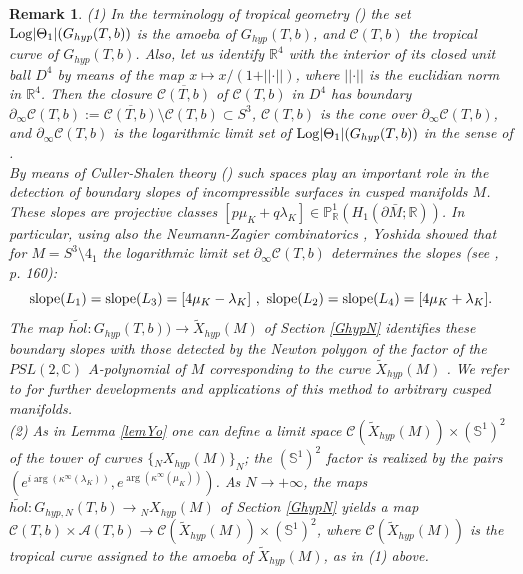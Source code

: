 \documentclass[11pt]{amsart}
\newtheorem{remark}[teo]{Remark}
\newcommand{\mr}{\mathbb{R}}
\newcommand{\mc}{\mathbb{C}}
\newcommand{\ra}{\rightarrow}
\begin{document}
{\begin{remark}\label{tropremk} {\rm (1) In the terminology of tropical geometry (\cite{V}) the set ${\rm Log}\vert \Theta_1\vert(G_{hyp}(T,b))$ is the {\it amoeba} of $G_{hyp}(T,b)$, and $\mathcal{C}(T,b)$ the {\it tropical curve} of $G_{hyp}(T,b)$. Also, let us identify $\mr^4$ with the interior of its closed unit ball $D^{4}$ by means of the map $x\mapsto x/(1+ \vert \vert \cdot \vert \vert)$, where $\vert \vert \cdot \vert \vert$ is the euclidian norm in $\mr^4$. Then the closure $\overline{\mathcal{C}(T,b)}$ of $\mathcal{C}(T,b)$ in $D^{4}$ has boundary $\partial_\infty \mathcal{C}(T,b) := \overline{\mathcal{C}(T,b)}\setminus \mathcal{C}(T,b)\subset S^3$,  $\mathcal{C}(T,b)$ is the cone over $\partial_\infty \mathcal{C}(T,b)$, and $\partial_\infty \mathcal{C}(T,b)$ is the {\it logarithmic limit set} of ${\rm Log}\vert \Theta_1\vert(G_{hyp}(T,b))$ in the sense of \cite{Berg}.\\
By means of Culler-Shalen theory (\cite{CS,Shalen}) such spaces play an important role in the detection of boundary slopes of incompressible surfaces in cusped manifolds $M$. These slopes are projective classes $[p\mu_K + q\lambda_K]\in \mathbb{P}^1_\mr(H_1(\partial \bar M;\mr))$. In particular, using also the Neumann-Zagier combinatorics \cite{NZ}, Yoshida showed that for $M=S^3\setminus 4_1$ the logarithmic limit set $\partial_\infty \mathcal{C}(T,b)$ determines the slopes (see \cite{Yo}, p. 160):
\begin{equation}\label{bslopes}
{\rm slope}(L_1) = {\rm slope}(L_3) = [4\mu_K - \lambda_K]\ ,\ {\rm slope}(L_2) = {\rm slope}(L_4) = [4\mu_K + \lambda_K].
\end{equation}
The map $\tilde{hol}\colon G_{hyp}(T,b))\ra \tilde{X}_{hyp}(M)$ of Section \ref{GhypN} identifies these boundary slopes with those detected by the Newton polygon of the factor of the $PSL(2,\mc)$ $A$-polynomial of $M$ corresponding to the curve $\tilde{X}_{hyp}(M)$ \cite{CCGLS,BD,Champ}. We refer to \cite{Tillmann0,Tillmann,Kabaya} for further developments and applications of this method to arbitrary cusped manifolds.\\
(2) As in Lemma \ref{lemYo} one can define a limit space $\mathcal{C}(\tilde X_{hyp}(M))\times (\mathbb{S}^1)^2$ of the tower of curves $\{{}_NX_{hyp}(M)\}_N$; the $(\mathbb{S}^1)^2$ factor is realized by the pairs $(e^{i\arg(\kappa^\infty(\lambda_K))},e^{\arg(\kappa^\infty(\mu_K))})$. As $N\to +\infty$, the maps $\widetilde{hol}\colon G_{hyp,N}(T,b) \rightarrow {}_NX_{hyp}(M)$ of Section \ref{GhypN} yields a map $\mathcal{C}(T,b)\times \mathcal{A}(T,b)\longrightarrow \mathcal{C}(\tilde X_{hyp}(M))\times (\mathbb{S}^1)^2$, where $\mathcal{C}(\tilde X_{hyp}(M))$ is the tropical curve assigned to the amoeba of $\tilde X_{hyp}(M)$, as in (1) above.} 
\end{remark}

}
\end{document}
